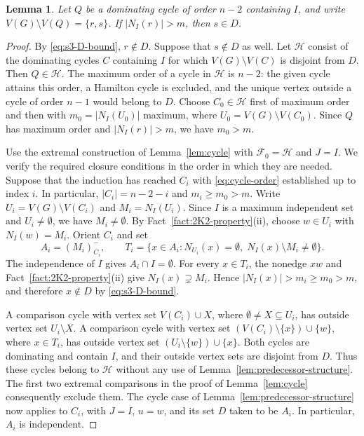 \documentclass[11pt]{article}
\numberwithin{equation}{section}
\newtheorem{lemma}[theorem]{Lemma}
\theoremstyle{plain}
\theoremstyle{definition}
\theoremstyle{plain}
\begin{document}
\begin{lemma}\label{prop:s3-omitted-vertices}
Let $Q$ be a dominating cycle of order $n-2$ containing $I$, and write
$V(G)\setminus V(Q)=\{r,s\}$.
If $|N_I(r)|>m$, then $s\in D$.
\end{lemma}

\begin{proof}
By \eqref{eq:s3-D-bound}, $r\notin D$.
Suppose that $s\notin D$ as well.
Let $\mathcal H$ consist of the dominating cycles $C$ containing $I$
for which $V(G)\setminus V(C)$ is disjoint from $D$.
Then $Q\in\mathcal{H}$.
The maximum order of a cycle in $\mathcal{H}$ is $n-2$: the given
cycle attains this order, a Hamilton cycle is excluded, and the
unique vertex outside a cycle of order $n-1$ would belong to $D$.
Choose $C_0\in\mathcal{H}$ first of maximum order and then with
$m_0=|N_I(U_0)|$ maximum, where $U_0=V(G)\setminus V(C_0)$.
Since $Q$    has maximum order and $|N_I(r)|>m$, we have $m_0>m$.

Use the extremal construction of Lemma~\ref{lem:cycle} with
$\mathcal F_0=\mathcal H$ and $J=I$. We verify the required closure
conditions in the order in which they are needed. Suppose that the
induction has reached $C_i$ with \eqref{eq:cycle-order} established up to index $i$.
In particular, $|C_i|=n-2-i$ and $m_i\ge m_0>m$.
Write $U_i=V(G)\setminus V(C_i)$ and $M_i=N_I(U_i)$.
Since $I$ is a maximum independent set and $U_i\ne\emptyset$,
we have $M_i\ne\emptyset$. By Fact~\ref{fact:2K2-property}(ii), choose $w\in U_i$
with $N_I(w)=M_i$. Orient $C_i$ and set
\[
 A_i=(M_i)^-_{C_i},\qquad
 T_i=\{x\in A_i:N_{U_i}(x)=\emptyset,\;
                         N_I(x)\setminus M_i\ne\emptyset\}.
\]
The independence of $I$ gives $A_i\cap I=\emptyset$.
For every $x\in T_i$, the nonedge $xw$ and Fact~\ref{fact:2K2-property}\textup{(ii)} give
$N_I(x)\supsetneq M_i$. Hence
 $|N_I(x)|>m_i\ge m_0>m$,
and therefore $x\notin D$ by \eqref{eq:s3-D-bound}.

A comparison cycle with vertex set $V(C_i)\cup X$, where
$\emptyset\ne X\subseteq U_i$, has outside vertex set $U_i\setminus X$.
A comparison cycle with vertex set
$(V(C_i)\setminus\{x\})\cup\{w\}$, where $x\in T_i$, has outside
vertex set $(U_i\setminus\{w\})\cup\{x\}$.
Both cycles are dominating and contain $I$, and their outside
vertex sets are disjoint from $D$. Thus these cycles belong to
$\mathcal H$ without any
use of Lemma~\ref{lem:predecessor-structure}. The first two extremal comparisons in the proof of
Lemma~\ref{lem:cycle} consequently exclude them. The cycle case of Lemma~\ref{lem:predecessor-structure} now applies to $C_i$,
with $J=I$, $u=w$, and its set $D$ taken to be $A_i$.
In particular, $A_i$ is independent.


\end{proof}
\end{document}
